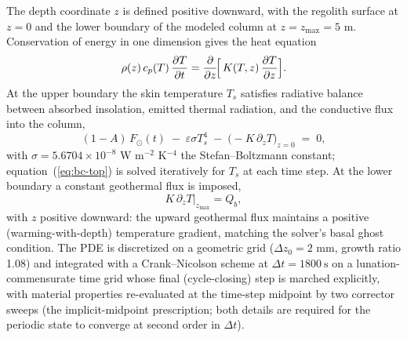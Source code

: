 \documentclass[11pt]{article}
\begin{document}
The depth coordinate $z$ is defined positive downward, with the regolith
surface at $z=0$ and the lower boundary of the modeled column at
$z=z_\mathrm{max}=5$ m. Conservation of energy in one dimension gives the
heat equation
\begin{equation}
\rho(z)\,c_p(T)\,\frac{\partial T}{\partial t}
   = \frac{\partial}{\partial z}\!\Bigl[\,K(T,z)\,\frac{\partial T}{\partial z}\Bigr].
\label{eq:heat}
\end{equation}
At the upper boundary the skin temperature $T_s$ satisfies radiative
balance between absorbed insolation, emitted thermal radiation, and the
conductive flux into the column,
\begin{equation}
(1-A)\,F_\odot(t)\;-\;\varepsilon\sigma T_s^4
\;-\;\bigl(-K\,\partial_z T\bigr)_{\!z=0} \;=\; 0,
\label{eq:bc-top}
\end{equation}
with $\sigma=5.6704\times10^{-8}$ W m$^{-2}$ K$^{-4}$ the Stefan--Boltzmann
constant; equation~(\ref{eq:bc-top}) is solved iteratively
for $T_s$ at each time step. At the lower boundary a constant geothermal
flux is imposed,
\begin{equation}
K\,\partial_z T\big|_{z_\mathrm{max}} = Q_b,
\label{eq:bc-bot}
\end{equation}
with $z$ positive downward: the upward geothermal flux maintains a
positive (warming-with-depth) temperature gradient, matching the solver's
basal ghost condition. The PDE is discretized on a geometric grid ($\Delta z_0=2$ mm, growth ratio
1.08) and integrated with a Crank--Nicolson scheme at
$\Delta t = \SI{1800}{\second}$ on a lunation-commensurate time grid whose
final (cycle-closing) step is marched explicitly, with material properties
re-evaluated at the time-step midpoint by two corrector sweeps
(the implicit-midpoint prescription; both details are required for the
periodic state to converge at second order in $\Delta t$).
\end{document}
